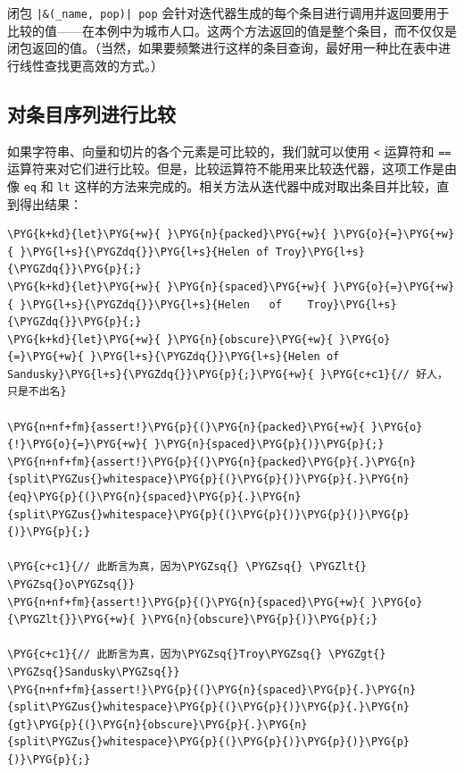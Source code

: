 闭包 \texttt{|\&(\_name, pop)| pop} 会针对迭代器生成的每个条目进行调用并返回要用于比较的值——在本例中为城市人口。这两个方法返回的值是整个条目，而不仅仅是闭包返回的值。（当然，如果要频繁进行这样的条目查询，最好用一种比在表中进行线性查找更高效的方式。）

\subsection{对条目序列进行比较}

如果字符串、向量和切片的各个元素是可比较的，我们就可以使用 \texttt{<} 运算符和 \texttt{==} 运算符来对它们进行比较。但是，比较运算符不能用来比较迭代器，这项工作是由像 \texttt{eq} 和 \texttt{lt} 这样的方法来完成的。相关方法从迭代器中成对取出条目并比较，直到得出结果：

\begin{Verbatim}[commandchars=\\\{\},breaklines=true,breakanywhere=true,fontsize=\codefont,xleftmargin=17bp]
\PYG{k+kd}{let}\PYG{+w}{ }\PYG{n}{packed}\PYG{+w}{ }\PYG{o}{=}\PYG{+w}{ }\PYG{l+s}{\PYGZdq{}}\PYG{l+s}{Helen of Troy}\PYG{l+s}{\PYGZdq{}}\PYG{p}{;}
\PYG{k+kd}{let}\PYG{+w}{ }\PYG{n}{spaced}\PYG{+w}{ }\PYG{o}{=}\PYG{+w}{ }\PYG{l+s}{\PYGZdq{}}\PYG{l+s}{Helen   of    Troy}\PYG{l+s}{\PYGZdq{}}\PYG{p}{;}
\PYG{k+kd}{let}\PYG{+w}{ }\PYG{n}{obscure}\PYG{+w}{ }\PYG{o}{=}\PYG{+w}{ }\PYG{l+s}{\PYGZdq{}}\PYG{l+s}{Helen of Sandusky}\PYG{l+s}{\PYGZdq{}}\PYG{p}{;}\PYG{+w}{ }\PYG{c+c1}{// 好人，只是不出名}

\PYG{n+nf+fm}{assert!}\PYG{p}{(}\PYG{n}{packed}\PYG{+w}{ }\PYG{o}{!}\PYG{o}{=}\PYG{+w}{ }\PYG{n}{spaced}\PYG{p}{)}\PYG{p}{;}
\PYG{n+nf+fm}{assert!}\PYG{p}{(}\PYG{n}{packed}\PYG{p}{.}\PYG{n}{split\PYGZus{}whitespace}\PYG{p}{(}\PYG{p}{)}\PYG{p}{.}\PYG{n}{eq}\PYG{p}{(}\PYG{n}{spaced}\PYG{p}{.}\PYG{n}{split\PYGZus{}whitespace}\PYG{p}{(}\PYG{p}{)}\PYG{p}{)}\PYG{p}{)}\PYG{p}{;}

\PYG{c+c1}{// 此断言为真，因为\PYGZsq{} \PYGZsq{} \PYGZlt{} \PYGZsq{}o\PYGZsq{}}
\PYG{n+nf+fm}{assert!}\PYG{p}{(}\PYG{n}{spaced}\PYG{+w}{ }\PYG{o}{\PYGZlt{}}\PYG{+w}{ }\PYG{n}{obscure}\PYG{p}{)}\PYG{p}{;}

\PYG{c+c1}{// 此断言为真，因为\PYGZsq{}Troy\PYGZsq{} \PYGZgt{} \PYGZsq{}Sandusky\PYGZsq{}}
\PYG{n+nf+fm}{assert!}\PYG{p}{(}\PYG{n}{spaced}\PYG{p}{.}\PYG{n}{split\PYGZus{}whitespace}\PYG{p}{(}\PYG{p}{)}\PYG{p}{.}\PYG{n}{gt}\PYG{p}{(}\PYG{n}{obscure}\PYG{p}{.}\PYG{n}{split\PYGZus{}whitespace}\PYG{p}{(}\PYG{p}{)}\PYG{p}{)}\PYG{p}{)}\PYG{p}{;}
\end{Verbatim}

